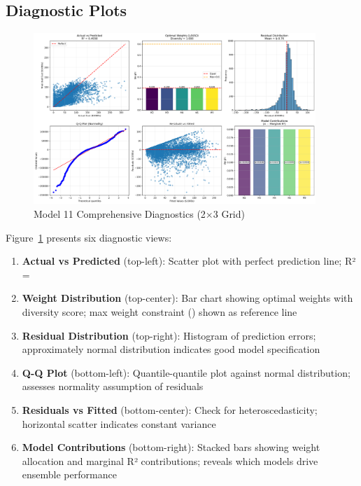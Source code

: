 \subsection{Diagnostic Plots}

\begin{figure}[h]
\centering
\includegraphics[width=0.95\textwidth]{models/model_11/diagnostic_plots.png}
\caption{Model 11 Comprehensive Diagnostics (2×3 Grid)}
\label{fig:model11_diagnostics}
\end{figure}

Figure~\ref{fig:model11_diagnostics} presents six diagnostic views:

\begin{enumerate}
    \item \textbf{Actual vs Predicted} (top-left): Scatter plot with perfect prediction line; R² = \ModelElevenRSquaredTest{}
    
    \item \textbf{Weight Distribution} (top-center): Bar chart showing optimal weights with diversity score; max weight constraint (\ModelElevenMaxWeight{}) shown as reference line
    
    \item \textbf{Residual Distribution} (top-right): Histogram of prediction errors; approximately normal distribution indicates good model specification
    
    \item \textbf{Q-Q Plot} (bottom-left): Quantile-quantile plot against normal distribution; assesses normality assumption of residuals
    
    \item \textbf{Residuals vs Fitted} (bottom-center): Check for heteroscedasticity; horizontal scatter indicates constant variance
    
    \item \textbf{Model Contributions} (bottom-right): Stacked bars showing weight allocation and marginal R² contributions; reveals which models drive ensemble performance
\end{enumerate}

